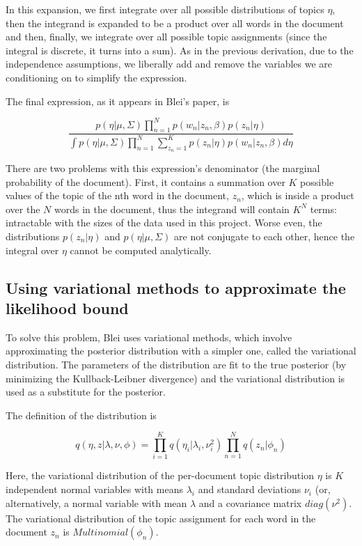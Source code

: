 \documentclass[12pt,a4paper,twoside,openright]{report}
\begin{document}
In this expansion, we first integrate over all possible distributions of topics $\eta$, then the integrand is expanded to be a product over all words in the document and then, finally, we integrate over all possible topic assignments (since the integral is discrete, it turns into a sum). As in the previous derivation, due to the independence assumptions, we liberally add and remove the variables we are conditioning on to simplify the expression.

The final expression, as it appears in Blei's paper, is

\begin{equation}
\frac{p(\eta | \mu, \Sigma) \prod\limits_{n=1}^N p(w_n | z_n, \beta) p(z_n | \eta)}{\int p(\eta | \mu, \Sigma)  \prod\limits_{n=1}^N \sum\limits_{z_n=1}^K p(z_n | \eta) p(w_n | z_n, \beta) d\eta}
\end{equation}

There are two problems with this expression's denominator (the marginal probability of the document). First, it contains a summation over $K$ possible values of the topic of the nth word in the document, $z_n$, which is inside a product over the $N$ words in the document, thus the integrand will contain $K^N$ terms: intractable with the sizes of the data used in this project. Worse even, the distributions $p(z_n | \eta)$ and $p(\eta | \mu, \Sigma)$ are not conjugate to each other, hence the integral over $\eta$ cannot be computed analytically.

\subsection{Using variational methods to approximate the likelihood bound}

To solve this problem, Blei uses variational methods, which involve approximating the posterior distribution with a simpler one, called the variational distribution. The parameters of the distribution are fit to the true posterior (by minimizing the Kullback-Leibner divergence) and the variational distribution is used as a substitute for the posterior.

The definition of the distribution is

\begin{equation}
q(\eta, z | \lambda, \nu, \phi) = \prod\limits_{i=1}^K q(\eta_i|\lambda_i, \nu_i^2) \prod\limits_{n=1}^N q(z_n | \phi_n)
\end{equation}

Here, the variational distribution of the per-document topic distribution $\eta$ is $K$ independent normal variables with means $\lambda_i$ and standard deviations $\nu_i$ (or, alternatively, a normal variable with mean $\lambda$ and a covariance matrix $\mathit{diag}(\nu^2)$. The variational distribution of the topic assignment for each word in the document $z_n$ is $\mathit{Multinomial}(\phi_n)$.
\end{document}
